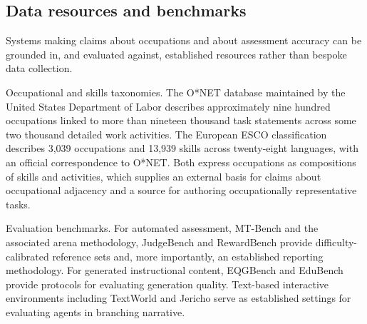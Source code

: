\subsection{Data resources and benchmarks}

Systems making claims about occupations and about assessment accuracy can be grounded in, and evaluated against, established resources rather than bespoke data collection.

Occupational and skills taxonomies. The O*NET database maintained by the United States Department of Labor describes approximately nine hundred occupations linked to more than nineteen thousand task statements across some two thousand detailed work activities\cite{r62}. The European ESCO classification describes 3,039 occupations and 13,939 skills across twenty-\allowbreak{}eight languages, with an official correspondence to O*NET\cite{r63}. Both express occupations as compositions of skills and activities, which supplies an external basis for claims about occupational adjacency and a source for authoring occupationally representative tasks.

Evaluation benchmarks. For automated assessment, MT-Bench and the associated arena methodology\cite{r57}, JudgeBench\cite{r60} and RewardBench\cite{r64} provide difficulty-\allowbreak{}calibrated reference sets and, more importantly, an established reporting methodology. For generated instructional content, EQGBench\cite{r65} and EduBench\cite{r66} provide protocols for evaluating generation quality. Text-based interactive environments including TextWorld\cite{r67} and Jericho\cite{r68} serve as established settings for evaluating agents in branching narrative.

